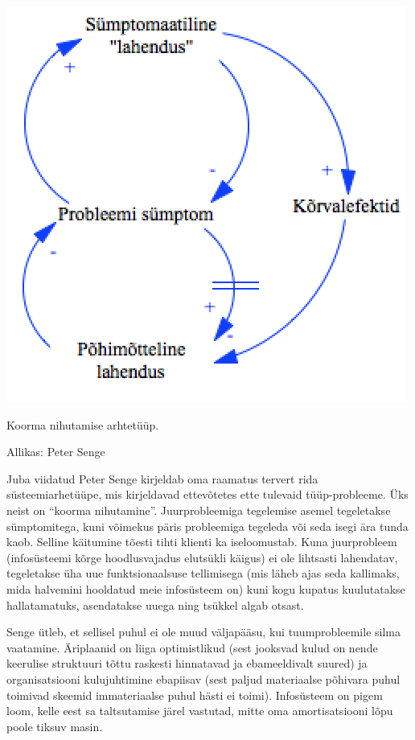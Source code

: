 \begin{marginfigure}
	\begin{center}
		\includegraphics[width=\linewidth]{shiftingburden.png}
		\caption{Koorma nihutamise arhtetüüp.}
		Allikas: Peter Senge
		\label{fig:shifting}
	\end{center}
\end{marginfigure}

Juba viidatud Peter Senge kirjeldab oma raamatus\cite{senge19905th} tervert rida süsteemiarhetüüpe, mis kirjeldavad ettevõtetes ette tulevaid tüüp-probleeme. Üks neist on \enquote{koorma nihutamine}. Juurprobleemiga tegelemise asemel tegeletakse sümptomitega, kuni võimekus päris probleemiga tegeleda või seda isegi ära tunda kaob. Selline käitumine tõesti tihti klienti ka iseloomustab. Kuna juurprobleem (infosüsteemi kõrge hoodlusvajadus elutsükli käigus) ei ole lihtsasti lahendatav, tegeletakse üha uue funktsionaalsuse tellimisega (mis läheb ajas seda kallimaks, mida halvemini hooldatud meie infosüsteem on) kuni kogu kupatus kuulutatakse hallatamatuks, asendatakse uuega ning tsükkel algab otsast.

Senge ütleb, et sellisel puhul ei ole muud väljapääsu, kui tuumprobleemile silma vaatamine. Äriplaanid on liiga optimistlikud (sest jooksvad kulud on nende keerulise struktuuri tõttu raskesti hinnatavad ja ebameeldivalt suured) ja organisatsiooni kulujuhtimine ebapiisav (sest paljud materiaalse põhivara puhul toimivad skeemid immateriaalse puhul hästi ei toimi). Infosüsteem on pigem loom, kelle eest sa taltsutamise järel vastutad, mitte oma amortisatsiooni lõpu poole tiksuv masin.